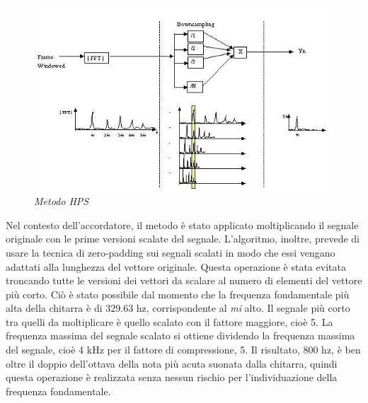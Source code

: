 	\begin{figure}[h]
	  \begin{center} 
	    \includegraphics[width=\textwidth*\real{0.9}]{images/ch_04/processo.jpg}
	  \end{center} 
	  \caption{\textit{Metodo HPS}}  
	  \label{fig:HPS}
	\end{figure}

Nel contesto dell'accordatore, il metodo è stato applicato moltiplicando il segnale originale con le prime versioni scalate del segnale.
L'algoritmo, inoltre, prevede di usare la tecnica di zero-padding sui segnali scalati in modo che essi vengano adattati alla lunghezza del vettore originale. 
Questa operazione è stata evitata troncando tutte le versioni dei vettori da scalare al numero di elementi del vettore più corto.
Ciò è stato possibile dal momento che la frequenza fondamentale più alta della chitarra è di 329.63 hz, corrispondente al \emph{mi} alto.
Il segnale più corto tra quelli da moltiplicare è quello scalato con il fattore maggiore, cioè 5.
La frequenza massima del segnale scalato si ottiene dividendo la frequenza massima del segnale, cioè 4 kHz per il fattore di compressione, 5. 
Il risultato, 800 hz, è ben oltre il doppio dell'ottava della nota più acuta suonata dalla chitarra, quindi questa operazione è realizzata senza nessun rischio per l'individuazione della frequenza fondamentale.







